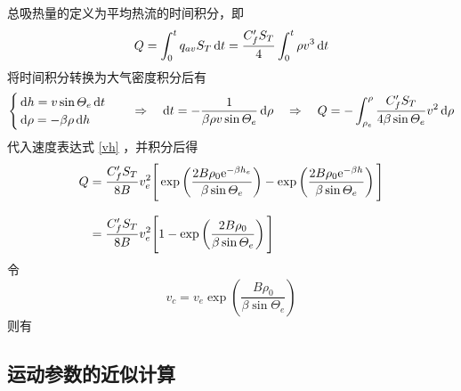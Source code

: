 \sssection[总吸热量$Q$]

总吸热量的定义为平均热流的时间积分，即
\begin{equation}
	Q = \int_0^t q_{av} S_T \,{\rm{d}} t = \dfrac{C'_f S_T}{4} \int_0^t \rho v^3 \, {\rm{d}} t
\end{equation}
将时间积分转换为大气密度积分后有
\begin{equation}
	\begin{cases}
		\, {\rm{d}} h = v \sin \varTheta_e \, {\rm{d}} t \\
		\, {\rm{d}} \rho = - \beta \rho \, {\rm{d}} h
	\end{cases}
	\quad \Rightarrow \quad {\rm{d}} t = -\dfrac{1}{\beta \rho v \sin \varTheta_e}\, {\rm{d}} \rho \quad \Rightarrow \quad 
	Q = - \int_{\rho_e}^{\rho} \dfrac{C'_f S_T}{4 \beta \sin \varTheta_e} v^2 \, {\rm{d}} \rho
\end{equation}
代入速度表达式 \eqref{vh} ，并积分后得
\begin{equation}
	\begin{split}
		Q &= \dfrac{C'_fS_T}{8B}v_e^2 \Bigg[\exp\left(\dfrac{2B\rho_0 {\rm{e}}^{-\beta h_e}}{\beta \sin \varTheta_e}\right) - \exp \left(\dfrac{2B \rho_0 {\rm{e}}^{-\beta h}}{\beta \sin \varTheta_e}\right)\Bigg]\\[0.8em]
		&= \dfrac{C'_fS_T}{8B}v_e^2 \Bigg[1 - \exp \left(\dfrac{2B\rho_0}{\beta \sin \varTheta_e}\right)\Bigg]
	\end{split}
\end{equation}
令
\begin{equation*}
	v_c = v_e \exp\left(\dfrac{B \rho_0}{\beta \sin \varTheta_e}\right)
\end{equation*}
则有




\subsection{运动参数的近似计算}
\sssection[速度与当地速度倾角的近似计算]
\vspace*{-0.5em}


